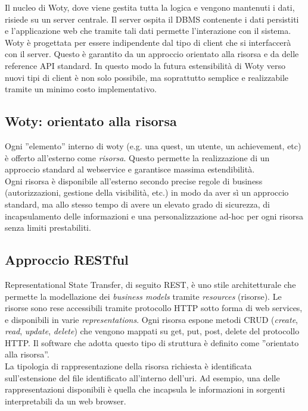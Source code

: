 Il nucleo di Woty, dove viene gestita tutta la logica e vengono mantenuti i dati, risiede su un server centrale. Il server ospita il DBMS contenente i dati persistiti e l'applicazione web che tramite tali dati permette l'interazione con il sistema.\\
Woty è progettata per essere indipendente dal tipo di client che si interfaccerà con il server. Questo è garantito da un approccio orientato alla risorsa e da delle reference API standard. In questo modo la futura estensibilità di Woty verso nuovi tipi di client è non solo possibile, ma soprattutto semplice e realizzabile tramite un minimo costo implementativo.\\


\subsection{Woty: orientato alla risorsa}
Ogni ''elemento'' interno di woty (e.g. una quest, un utente, un achievement, etc) è offerto all'esterno come \emph{risorsa}. Questo permette la realizzazione di un approccio standard al webservice e garantisce massima estendibilità. \\
Ogni risorsa è disponibile all'esterno secondo precise regole di business (autorizzazioni, gestione della visibilità, etc.) in modo da aver sì un approccio standard, ma allo stesso tempo di avere un elevato grado di sicurezza, di incapsulamento delle informazioni e una personalizzazione ad-hoc per ogni risorsa senza limiti prestabiliti.


\subsection{Approccio RESTful}

Representational State Transfer, di seguito REST, è uno stile architetturale che permette la modellazione dei \emph{business models} tramite \emph{resources} (risorse). Le risorse sono rese accessibili tramite protocollo HTTP sotto forma di web services, e disponibili in varie \emph{representations}. Ogni risorsa espone metodi CRUD (\emph{create}, \emph{read}, \emph{update}, \emph{delete}) che vengono mappati su get, put, post, delete del protocollo HTTP. Il software che adotta questo tipo di struttura è definito come ''orientato alla risorsa''.\\

La tipologia di rappresentazione della risorsa richiesta è identificata sull'estensione del file identificato all'interno dell'uri. Ad esempio, una delle rappresentazioni disponibili è quella che incapsula le informazioni in sorgenti interpretabili da un web browser.\\ 

